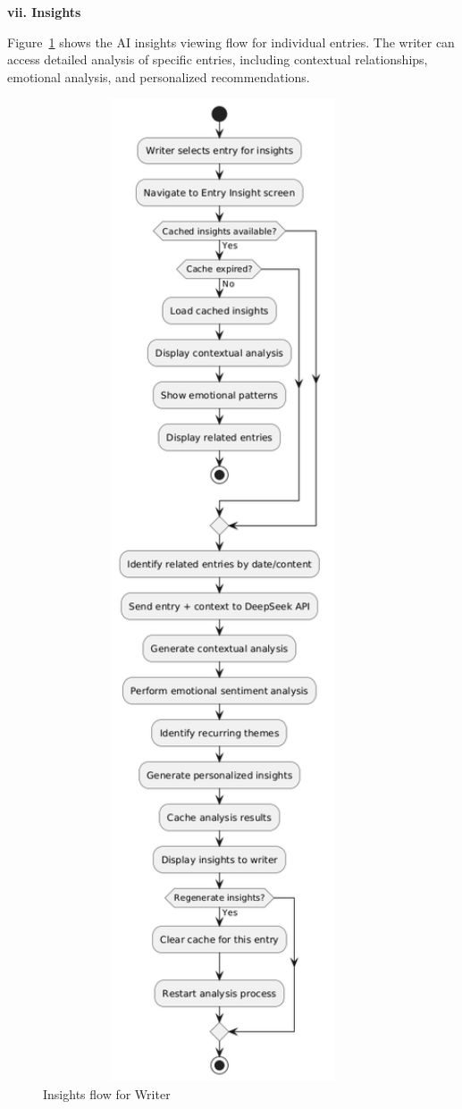 \textbf{vii. Insights}

Figure~\ref{fig:insights-flow} shows the AI insights viewing flow for individual entries. The writer can access detailed analysis of specific entries, including contextual relationships, emotional analysis, and personalized recommendations.

\begin{figure}[H]
\centering
\includegraphics[width=0.95\textwidth,height=0.7\textheight,keepaspectratio]{files/imgs/insights_flow.png}
\caption{Insights flow for Writer}
\label{fig:insights-flow}
\end{figure}
\clearpage

